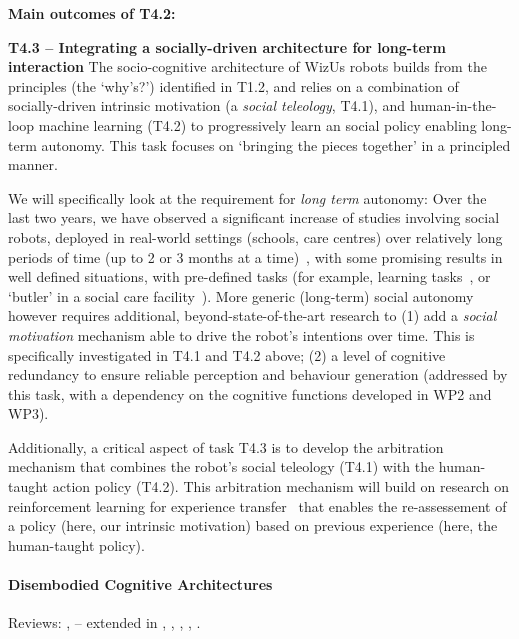 \documentclass[11pt,a4paper]{report}
\newcommand{\project}{WizUs\xspace}
\begin{document}
\begin{framed}
    {\bf Main outcomes of T4.2:}
\end{framed}


\textbf{T4.3 -- Integrating a socially-driven architecture for long-term interaction} The
socio-cognitive architecture of \project robots builds from the principles (the
`why's?') identified in T1.2, and relies on a combination of socially-driven
intrinsic motivation (a \emph{social teleology}, T4.1), and human-in-the-loop machine
learning (T4.2) to progressively learn an social policy enabling long-term
autonomy. This task focuses on `bringing the pieces together' in a principled
manner.

We will specifically look at the requirement for \emph{long term} autonomy: Over
the last two years, we have observed a significant increase of studies
involving social robots, deployed in real-world settings (schools, care centres)
over relatively long periods of time (up to 2 or 3 months at a
time)~\cite{kunze2018artificial,leite2013social}, with some promising results
in well defined situations, with pre-defined tasks (for example, learning
tasks~\cite{senft2019teaching}, or `butler' in a social care
facility~\cite{hawes2017strands}). More generic (long-term) social autonomy
however requires additional, beyond-state-of-the-art research to (1) add a
\emph{social motivation} mechanism able to drive the robot's intentions over
time. This is specifically investigated in T4.1 and T4.2 above; (2) a level of
cognitive redundancy to ensure reliable perception and behaviour generation
(addressed by this task, with a dependency on the cognitive functions developed
in WP2 and WP3).

Additionally, a critical aspect of task T4.3 is to develop the arbitration
mechanism that combines the robot's social teleology (T4.1) with the human-taught
action policy (T4.2). This arbitration mechanism will build on research on
reinforcement learning for experience transfer~\cite{madden2004transfer} that
enables the re-assessement of a policy (here, our intrinsic motivation) based on
previous experience (here, the human-taught policy).



\paragraph{Disembodied Cognitive Architectures}

Reviews: \cite{chong2007integrated}, \cite{vernon2007survey} --
extended in \cite{kingdon2008review}, \cite{duch2008cognitive},
\cite{langley2009cognitive}, \cite{taatgen2010past},
\cite{thorisson2012cognitive}.
\end{document}
